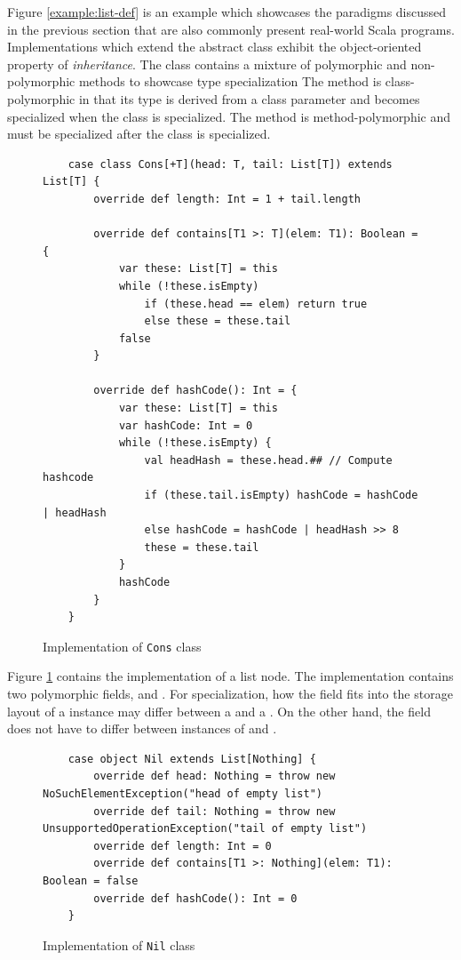 Figure \ref{example:list-def} is an example which showcases the paradigms discussed in the previous section that are also commonly present real-world Scala programs.
Implementations which extend the abstract  class exhibit the object-oriented property of \textit{inheritance}.
The  class contains a mixture of polymorphic and non-polymorphic methods to showcase type specialization
The  method is class-polymorphic in that its type is derived from a class parameter and becomes specialized when the class is specialized.
The  method is method-polymorphic and must be specialized after the class is specialized.

\begin{figure}[!htb]
	\begin{verbatim}
	case class Cons[+T](head: T, tail: List[T]) extends List[T] {
		override def length: Int = 1 + tail.length
		
		override def contains[T1 >: T](elem: T1): Boolean = {
			var these: List[T] = this
			while (!these.isEmpty) 
				if (these.head == elem) return true
				else these = these.tail
			false
		}
			
		override def hashCode(): Int = {
			var these: List[T] = this
			var hashCode: Int = 0
			while (!these.isEmpty) {
				val headHash = these.head.## // Compute hashcode
				if (these.tail.isEmpty) hashCode = hashCode | headHash
				else hashCode = hashCode | headHash >> 8
				these = these.tail
			}
			hashCode
		}
	}
	\end{verbatim}
	\caption{Implementation of \texttt{Cons} class}
	\label{example:cons-impl}
\end{figure}

Figure \ref{example:cons-impl} contains the implementation of a list node.
The  implementation contains two polymorphic fields,  and .
For specialization, how the  field fits into the storage layout of a  instance may differ between a  and a .
On the other hand, the  field does not have to differ between instances of  and .

\begin{figure}[!htb]
	\begin{verbatim}
	case object Nil extends List[Nothing] {
		override def head: Nothing = throw new NoSuchElementException("head of empty list")
		override def tail: Nothing = throw new UnsupportedOperationException("tail of empty list")
		override def length: Int = 0
		override def contains[T1 >: Nothing](elem: T1): Boolean = false
		override def hashCode(): Int = 0
	}
	\end{verbatim}
	\caption{Implementation of \texttt{Nil} class}
	\label{example:nil-impl}
\end{figure}


